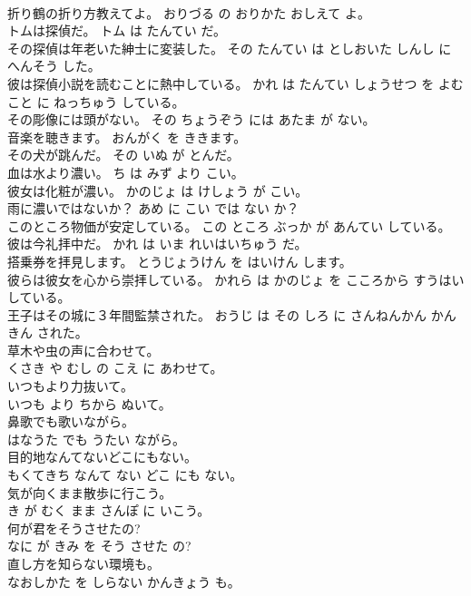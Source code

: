 \documentclass[8pt]{extreport}
\begin{document}
\begin{CJK}{UTF8}{min}
\\	折り鶴の折り方教えてよ。	おりづる の おりかた おしえて よ。	
\\	トムは探偵だ。	トム は たんてい だ。	
\\	その探偵は年老いた紳士に変装した。	その たんてい は としおいた しんし に へんそう した。	
\\	彼は探偵小説を読むことに熱中している。	かれ は たんてい しょうせつ を よむ こと に ねっちゅう している。	
\\	その彫像には頭がない。	その ちょうぞう には あたま が ない。	
\\	音楽を聴きます。	おんがく を ききます。	
\\	その犬が跳んだ。	その いぬ が とんだ。	
\\	血は水より濃い。	ち は みず より こい。	
\\	彼女は化粧が濃い。	かのじょ は けしょう が こい。	
\\	雨に濃いではないか？	あめ に こい では ない か？	
\\	このところ物価が安定している。	この ところ ぶっか が あんてい している。	
\\	彼は今礼拝中だ。	かれ は いま れいはいちゅう だ。	
\\	搭乗券を拝見します。	とうじょうけん を はいけん します。	
\\	彼らは彼女を心から崇拝している。	かれら は かのじょ を こころから すうはい している。	
\\	王子はその城に３年間監禁された。	おうじ は その しろ に さんねんかん かんきん された。	
\\	草木や虫の声に合わせて。	
\\	くさき や むし の こえ に あわせて。	
\\	いつもより力抜いて。	
\\	いつも より ちから ぬいて。	
\\	鼻歌でも歌いながら。	
\\	はなうた でも うたい ながら。	
\\	目的地なんてないどこにもない。	
\\	もくてきち なんて ない どこ にも ない。	
\\	気が向くまま散歩に行こう。	
\\	き が むく まま さんぽ に いこう。	
\\	何が君をそうさせたの?	
\\	なに が きみ を そう させた の?	
\\	直し方を知らない環境も。	
\\	なおしかた を しらない かんきょう も。	

\end{CJK}
\end{document}
